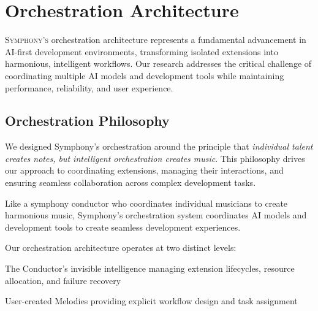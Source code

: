 
\section*{Orchestration Architecture}

\lettrine{S}{ymphony's} orchestration architecture represents a fundamental advancement in AI-first development environments, transforming isolated extensions into harmonious, intelligent workflows. Our research addresses the critical challenge of coordinating multiple AI models and development tools while maintaining performance, reliability, and user experience.

\subsection*{Orchestration Philosophy}

We designed Symphony's orchestration around the principle that \textit{individual talent creates notes, but intelligent orchestration creates music}. This philosophy drives our approach to coordinating extensions, managing their interactions, and ensuring seamless collaboration across complex development tasks.

\begin{infobox}[title=Orchestration Metaphor]
Like a symphony conductor who coordinates individual musicians to create harmonious music, Symphony's orchestration system coordinates AI models and development tools to create seamless development experiences.
\end{infobox}

Our orchestration architecture operates at two distinct levels:

\begin{description}[leftmargin=4cm,labelwidth=3.5cm]
    \item[\textbf{Automatic Orchestration}] The Conductor's invisible intelligence managing extension lifecycles, resource allocation, and failure recovery
    \item[\textbf{Manual Orchestration}] User-created Melodies providing explicit workflow design and task assignment
\end{description}


